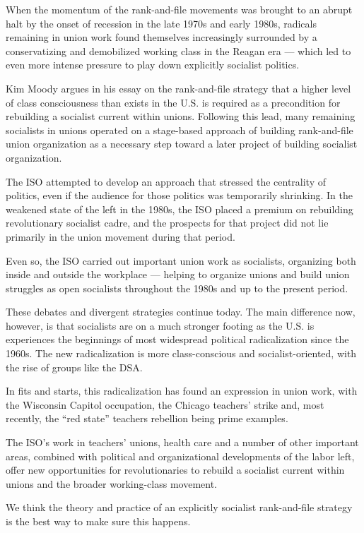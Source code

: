 When the momentum of the rank-and-file movements was brought to an abrupt halt by the onset of recession in the late 1970s and early 1980s, radicals remaining in union work found themselves increasingly surrounded by a conservatizing and demobilized working class in the Reagan era — which led to even more intense pressure to play down explicitly socialist politics.

Kim Moody argues in his essay on the rank-and-file strategy that a higher level of class consciousness than exists in the U.S. is required as a precondition for rebuilding a socialist current within unions. Following this lead, many remaining socialists in unions operated on a stage-based approach of building rank-and-file union organization as a necessary step toward a later project of building socialist organization.

The ISO attempted to develop an approach that stressed the centrality of politics, even if the audience for those politics was temporarily shrinking. In the weakened state of the left in the 1980s, the ISO placed a premium on rebuilding revolutionary socialist cadre, and the prospects for that project did not lie primarily in the union movement during that period.

Even so, the ISO carried out important union work as socialists, organizing both inside and outside the workplace — helping to organize unions and build union struggles as open socialists throughout the 1980s and up to the present period.

These debates and divergent strategies continue today. The main difference now, however, is that socialists are on a much stronger footing as the U.S. is experiences the beginnings of most widespread political radicalization since the 1960s. The new radicalization is more class-conscious and socialist-oriented, with the rise of groups like the DSA.

In fits and starts, this radicalization has found an expression in union work, with the Wisconsin Capitol occupation, the Chicago teachers’ strike and, most recently, the “red state” teachers rebellion being prime examples.

The ISO’s work in teachers’ unions, health care and a number of other important areas, combined with political and organizational developments of the labor left, offer new opportunities for revolutionaries to rebuild a socialist current within unions and the broader working-class movement.

We think the theory and practice of an explicitly socialist rank-and-file strategy is the best way to make sure this happens.
